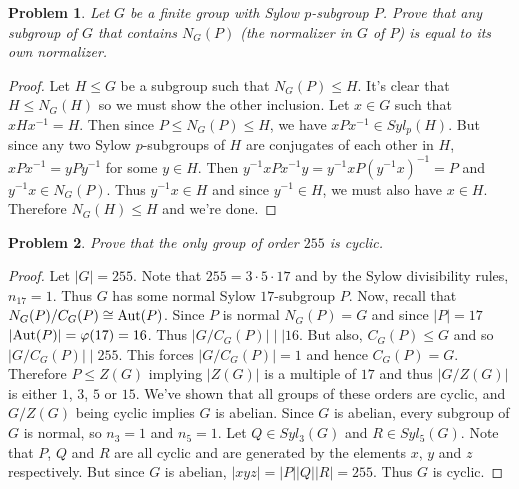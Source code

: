 \documentclass{article}
\newtheorem{problem}{Problem}
\newcommand{\aut}{\textup{Aut}}
\begin{document}

\begin{problem}
Let $G$ be a finite group with Sylow $p$-subgroup $P$. Prove that any subgroup of $G$ that contains $N_G(P)$ (the normalizer in $G$ of $P$) is equal to its own normalizer.
\end{problem}
\begin{proof}
Let $H \leq G$ be a subgroup such that $N_G(P) \leq H$. It's clear that $H \leq N_G(H)$ so we must show the other inclusion. Let $x \in G$ such that $xHx^{-1} = H$. Then since $P \leq N_G(P) \leq H$, we have $xPx^{-1} \in Syl_p(H)$. But since any two Sylow $p$-subgroups of $H$ are conjugates of each other in $H$, $xPx^{-1} = yPy^{-1}$ for some $y \in H$. Then $y^{-1}xPx^{-1}y = y^{-1}xP(y^{-1}x)^{-1} = P$ and $y^{-1}x \in N_G(P)$. Thus $y^{-1}x \in H$ and since $y^{-1} \in H$, we must also have $x \in H$. Therefore $N_G(H) \leq H$ and we're done.
\end{proof}

\begin{problem}
Prove that the only group of order $255$ is cyclic.
\end{problem}
\begin{proof}
Let $|G| = 255$. Note that $255 = 3 \cdot 5 \cdot 17$ and by the Sylow divisibility rules, $n_{17} = 1$. Thus $G$ has some normal Sylow $17$-subgroup $P$. Now, recall that $N_G(P)/C_G(P) \cong \aut (P)$. Since $P$ is normal $N_G(P) = G$ and since $|P| = 17$ $|\aut(P)| = \varphi(17) = 16$. Thus $|G/C_G(P)| \mid | 16$. But also, $C_G(P) \leq G$ and so $|G/C_G(P)| \mid 255$. This forces $|G/C_G(P)| = 1$ and hence $C_G(P) = G$. Therefore $P \leq Z(G)$ implying $|Z(G)|$ is a multiple of $17$ and thus $|G/Z(G)|$ is either $1$, $3$, $5$ or $15$. We've shown that all groups of these orders are cyclic, and $G/Z(G)$ being cyclic implies $G$ is abelian. Since $G$ is abelian, every subgroup of $G$ is normal, so $n_3 = 1$ and $n_5 = 1$. Let $Q \in Syl_3(G)$ and $R \in Syl_5(G)$. Note that $P$, $Q$ and $R$ are all cyclic and are generated by the elements $x$, $y$ and $z$ respectively. But since $G$ is abelian, $|xyz| = |P||Q||R| = 255$. Thus $G$ is cyclic.
\end{proof}
\end{document}
